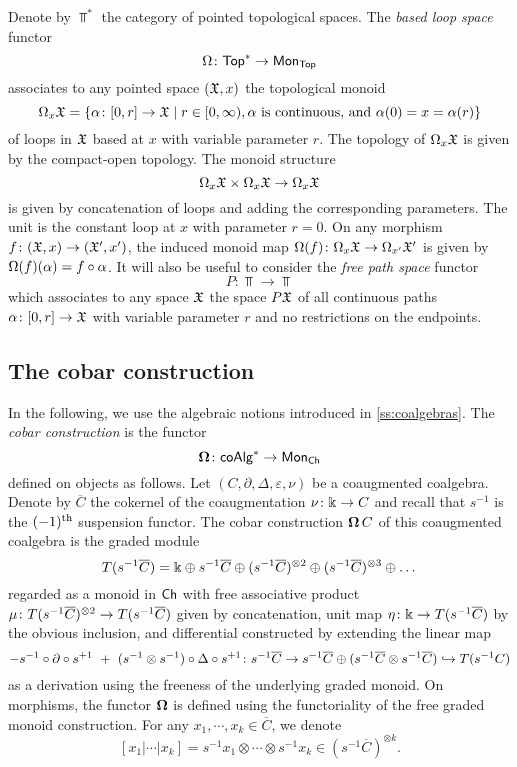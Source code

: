 Denote by $\Top^\ast$ the category of pointed topological spaces. The \textit{based loop space} functor
\[ \Omega \colon \mathsf{Top}^\ast \to \mathsf{Mon}_{\mathsf{Top}}\]
associates to any pointed space $(\mathfrak{X},x)$ the topological monoid
\[\Omega_x \mathfrak{X}= \{ \alpha \colon [0,r] \to \mathfrak{X} \mid r \in [0, \infty), \text{$\alpha$ is continuous, and } \alpha(0)=x=\alpha(r)\}
\]
of loops in $\mathfrak{X}$ based at $x$ with variable parameter $r$. The topology of $\Omega_x \mathfrak{X}$ is given by the compact-open topology. The monoid structure \[\Omega_x \mathfrak{X}  \times \Omega_x \mathfrak{X} \to \Omega_x \mathfrak{X}\] is given by concatenation of loops and adding the corresponding parameters. The unit is the constant loop at $x$ with parameter $r=0$. On any morphism $f \colon (\mathfrak{X},x) \to (\mathfrak{X}',x')$, the induced monoid map $\Omega (f) \colon \Omega_x \mathfrak{X} \to \Omega_{x'} \mathfrak{X}'$ is given by $\Omega(f) (\alpha) = f\circ\alpha$. It will also be useful to consider the \textit{free path space} functor
\[
P \colon \Top \to \Top
\]
which associates to any space $\mathfrak{X}$ the space $P\mathfrak{X}$ of all continuous paths $\alpha \colon [0,r] \to \mathfrak{X}$ with variable parameter $r$ and no restrictions on the endpoints. 
\subsection{The cobar construction}\label{ss:cobar construction}
In the following, we use the algebraic notions introduced in \cref{ss:coalgebras}. The \textit{cobar construction} is the functor
\[
\operatorname{\mathbf{\Omega}} \colon \mathsf{coAlg}^\ast \to \mathsf{Mon}_{\mathsf{Ch}}
\]
defined on objects as follows.
Let $(C, \partial, \Delta, \varepsilon, \nu)$ be a coaugmented coalgebra.
Denote by $\overline{C}$ the cokernel of the coaugmentation $\nu \colon \Bbbk \to C$ and recall that $s^{-1}$ is the $(-1)^{\mathrm{th}}$ suspension functor.
The cobar construction $\operatorname{\mathbf{\Omega}} C$ of this coaugmented coalgebra is the graded module
\[
T(s^{-1} \overline{C}) = \Bbbk \oplus s^{-1}\overline{C} \oplus (s^{-1}\overline{C})^{\otimes 2} \oplus (s^{-1}\overline{C})^{\otimes 3} \oplus \dots
\]
regarded as a monoid in $\mathsf{Ch}$ with free associative product $\mu \colon T(s^{-1} \overline{C})^{\otimes 2} \to T(s^{-1} \overline{C})$ given by concatenation, unit map $\eta \colon \Bbbk \to T(s^{-1} \overline{C})$ by the obvious inclusion, and differential constructed by extending the linear map
\[
- s^{-1} \circ \partial \circ s^{+1} \ + \ (s^{-1} \otimes s^{-1}) \circ \Delta \circ s^{+1} \colon
s^{-1} \overline{C} \to s^{-1}\overline{C} \oplus (s^{-1}\overline{C} \otimes s^{-1}\overline{C}) \hookrightarrow T(s^{-1}C)
\]
as a derivation using the freeness of the underlying graded monoid.  On morphisms, the functor $\operatorname{\mathbf{\Omega}}$ is defined using the functoriality of the free graded monoid construction. For any $x_1, \cdots, x_k \in \overline{C}$, we denote 
\[
[x_1| \cdots | x_k]= s^{-1} x_1 \otimes \cdots \otimes s^{-1}x_k \in (s^{-1}\overline{C})^{\otimes k}.
\]

